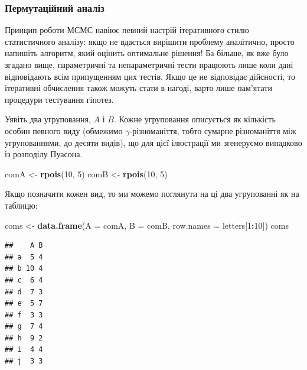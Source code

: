 \documentclass[
  11pt,
]{book}
\newenvironment{Shaded}{\begin{snugshade}}{\end{snugshade}}
\newcommand{\AttributeTok}[1]{\textcolor[rgb]{0.13,0.29,0.53}{#1}}
\newcommand{\DecValTok}[1]{\textcolor[rgb]{0.00,0.00,0.81}{#1}}
\newcommand{\FunctionTok}[1]{\textcolor[rgb]{0.13,0.29,0.53}{\textbf{#1}}}
\newcommand{\NormalTok}[1]{#1}
\newcommand{\OtherTok}[1]{\textcolor[rgb]{0.56,0.35,0.01}{#1}}
\newcommand{\SpecialCharTok}[1]{\textcolor[rgb]{0.81,0.36,0.00}{\textbf{#1}}}
\begin{document}
\subsubsection{Пермутаційний аналіз}\label{permutation-paradigm}

Принцип роботи МСМС навіює певний настрій ітеративного стилю статистичного аналізу: якщо не вдається вирішити проблему аналітично, просто напишіть алгоритм, який оцінить оптимальне рішення! Ба більше, як вже було згадано вище, параметричні та непараметричні тести працюють лише коли дані відповідають всім припущенням цих тестів. Якщо це не відповідає дійсності, то ітеративні обчислення також можуть стати в нагоді, варто лише пам'ятати процедури тестування гіпотез.

Уявіть два угруповання, \(A\) і \(B\). Кожне угруповання описується як кількість особин певного виду (обмежимо \(\gamma\)-різноманіття, тобто сумарне різноманіття між угрупованнями, до десяти видів), що для цієї ілюстрації ми згенеруємо випадково із розподілу Пуасона.

\begin{Shaded}
\begin{Highlighting}[]
\NormalTok{comA }\OtherTok{\textless{}{-}} \FunctionTok{rpois}\NormalTok{(}\DecValTok{10}\NormalTok{, }\DecValTok{5}\NormalTok{)}
\NormalTok{comB }\OtherTok{\textless{}{-}} \FunctionTok{rpois}\NormalTok{(}\DecValTok{10}\NormalTok{, }\DecValTok{5}\NormalTok{)}
\end{Highlighting}
\end{Shaded}

Якщо позначити кожен вид, то ми можемо поглянути на ці два угрупованні як на таблицю:

\begin{Shaded}
\begin{Highlighting}[]
\NormalTok{coms }\OtherTok{\textless{}{-}} \FunctionTok{data.frame}\NormalTok{(}\AttributeTok{A =}\NormalTok{ comA, }\AttributeTok{B =}\NormalTok{ comB, }\AttributeTok{row.names =}\NormalTok{ letters[}\DecValTok{1}\SpecialCharTok{:}\DecValTok{10}\NormalTok{])}
\NormalTok{coms}
\end{Highlighting}
\end{Shaded}

\begin{verbatim}
##    A B
## a  5 4
## b 10 4
## c  6 4
## d  7 3
## e  5 7
## f  3 3
## g  7 4
## h  9 2
## i  4 4
## j  3 3
\end{verbatim}
\end{document}

